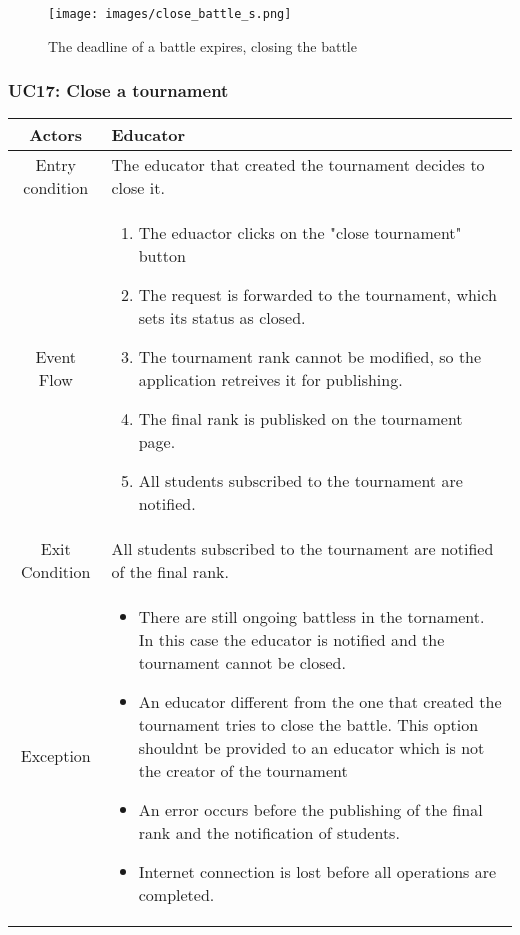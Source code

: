 \documentclass[a4paper, 11pt, titlepage]{article}
\begin{document}
\begin{figure}[h!]
    \centering
    \texttt{[image: images/close\_battle\_s.png]}
    \caption{The deadline of a battle expires, closing the battle}
    \label{fig:seq_diag_close_battle}
    
\end{figure}

\clearpage

\subsubsection*{UC17: Close a tournament}

\begin{center}
    \begin{tabularx}{\linewidth} {|c|X|}
        \hline 
        Actors & Educator\\
        \hline 
        Entry condition &
        The educator that created the tournament decides to close it.\\
        \hline 
        Event Flow &
        \begin{enumerate}
            \item The eduactor clicks on the "close tournament" button
            \item The request is forwarded to the tournament, which sets its status as closed.
            \item The tournament rank cannot be modified, so the application retreives it for publishing.
            \item The final rank is publisked on the tournament page.
            \item All students subscribed to the tournament are notified.
        \end{enumerate}\\
        \hline 
        Exit Condition &
        All students subscribed to the tournament are notified of the final rank.\\
        \hline 
        Exception & 
        \begin{itemize}
            \item There are still ongoing battless in the tornament. In this case the educator is notified and the tournament cannot be closed.
            \item An educator different from the one that created the tournament tries to close the battle. This option shouldnt be provided to an educator which is not the creator of the tournament 
            \item An error occurs before the publishing of the final rank and the notification of students.
            \item Internet connection is lost before all operations are completed.
        \end{itemize}\\
        \hline
    \end{tabularx}
\end{center}
\end{document}

